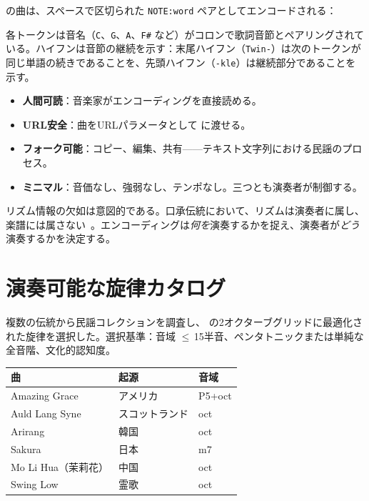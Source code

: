 \documentclass[11pt]{article}
\begin{document}
\np{} の曲は、スペースで区切られた \texttt{NOTE:word} ペアとしてエンコードされる：


各トークンは音名（\texttt{C}、\texttt{G}、\texttt{A}、\texttt{F\#} など）がコロンで歌詞音節とペアリングされている。ハイフンは音節の継続を示す：末尾ハイフン（\texttt{Twin-}）は次のトークンが同じ単語の続きであることを、先頭ハイフン（\texttt{-kle}）は継続部分であることを示す。

\begin{card}
\begin{itemize}
  \item \textbf{人間可読}：音楽家がエンコーディングを直接読める。
  \item \textbf{URL安全}：曲をURLパラメータとして \np{} に渡せる。
  \item \textbf{フォーク可能}：コピー、編集、共有——テキスト文字列における民謡のプロセス。
  \item \textbf{ミニマル}：音価なし、強弱なし、テンポなし。三つとも演奏者が制御する。
\end{itemize}
\end{card}

リズム情報の欠如は意図的である。口承伝統において、リズムは演奏者に属し、楽譜には属さない~\citep{lomax1968folk}。エンコーディングは\emph{何を}演奏するかを捉え、演奏者が\emph{どう}演奏するかを決定する。

\section{演奏可能な旋律カタログ}

複数の伝統から民謡コレクションを調査し、\np{} の2オクターブグリッドに最適化された旋律を選択した。選択基準：音域 $\leq$\,15半音、ペンタトニックまたは単純な全音階、文化的認知度。

\begin{card}
\begin{tabularx}{\linewidth}{Xll}
\toprule
\textbf{曲} & \textbf{起源} & \textbf{音域} \\
\midrule
Amazing Grace & アメリカ & P5+oct \\
Auld Lang Syne & スコットランド & oct \\
Arirang & 韓国 & oct \\
Sakura & 日本 & m7 \\
Mo Li Hua（茉莉花） & 中国 & oct \\
Swing Low & 霊歌 & oct \\
\bottomrule
\end{tabularx}
\end{card}
\end{document}
